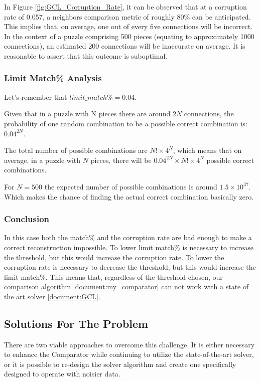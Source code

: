 \documentclass{article}
\begin{document}
In Figure \ref{fig:GCL_Corruption_Rate}, it can be observed that at a corruption rate of 0.057,
a neighbors comparison metric of roughly 80\% can be anticipated.
This implies that, on average, one out of every five connections will be incorrect.
In the context of a puzzle comprising 500 pieces (equating to approximately 1000 connections),
an estimated 200 connections will be inaccurate on average.
It is reasonable to assert that this outcome is suboptimal.

\subsubsection{Limit Match\% Analysis}
Let's remember that \(limit\_match\% = 0.04\).

Given that in a puzzle with N pieces there are around \(2N \) connections,
the probability of one random combination to be a
possible correct combination is: \(0.04^{2N}\).

The total number of possible combinations are \(N! \times 4^N\),
which means that on average, in a puzzle with \(N\) pieces,
there will be \(0.04^{2N} \times N! \times 4^N \)
possible correct combinations.

For \( N = 500 \) the expected number of possible combinations is around \( 1.5 \times 10^{37} \).
Which makes the chance of finding the actual correct combination basically zero.
\subsubsection{Conclusion}
In this case both the match\% and the corruption rate are bad enough to make a correct reconstruction impossible.
To lower limit match\% is necessary to increase the threshold, but this would increase the corruption rate.
To lower the corruption rate is necessary to decrease the threshold, but this would increase the limit match\%.
This means that, regardless of the threshold chosen, our comparison algorithm \ref{document:my_comparator}
can not work with a state of the art solver \ref{document:GCL}.

\subsection{Solutions For The Problem}

There are two viable approaches to overcome this challenge.
It is either necessary to enhance the Comparator while continuing
to utilize the state-of-the-art solver,
or it is possible to re-design the solver algorithm and create one
specifically designed to operate with noisier data.
\end{document}

